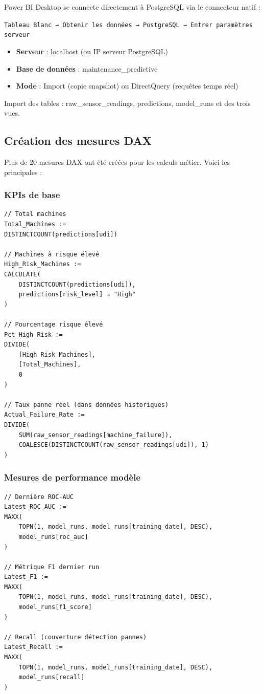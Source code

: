 \documentclass[a4paper,12pt,twoside]{report}
\begin{document}
Power BI Desktop se connecte directement à PostgreSQL via le connecteur natif :

\texttt{Tableau Blanc → Obtenir les données → PostgreSQL → Entrer paramètres serveur}

\begin{itemize}
    \item \textbf{Serveur} : localhost (ou IP serveur PostgreSQL)
    \item \textbf{Base de données} : maintenance\_predictive
    \item \textbf{Mode} : Import (copie snapshot) ou DirectQuery (requêtes temps réel)
\end{itemize}

Import des tables : raw\_sensor\_readings, predictions, model\_runs et des trois vues.

\subsection{Création des mesures DAX}

Plus de 20 mesures DAX ont été créées pour les calculs métier. Voici les principales :

\subsubsection{KPIs de base}

\begin{lstlisting}[language=DAX]
// Total machines
Total_Machines := 
DISTINCTCOUNT(predictions[udi])

// Machines à risque élevé
High_Risk_Machines := 
CALCULATE(
    DISTINCTCOUNT(predictions[udi]),
    predictions[risk_level] = "High"
)

// Pourcentage risque élevé
Pct_High_Risk := 
DIVIDE(
    [High_Risk_Machines],
    [Total_Machines],
    0
)

// Taux panne réel (dans données historiques)
Actual_Failure_Rate := 
DIVIDE(
    SUM(raw_sensor_readings[machine_failure]),
    COALESCE(DISTINCTCOUNT(raw_sensor_readings[udi]), 1)
)
\end{lstlisting}

\subsubsection{Mesures de performance modèle}

\begin{lstlisting}[language=DAX]
// Dernière ROC-AUC
Latest_ROC_AUC := 
MAXX(
    TOPN(1, model_runs, model_runs[training_date], DESC),
    model_runs[roc_auc]
)

// Métrique F1 dernier run
Latest_F1 := 
MAXX(
    TOPN(1, model_runs, model_runs[training_date], DESC),
    model_runs[f1_score]
)

// Recall (couverture détection pannes)
Latest_Recall := 
MAXX(
    TOPN(1, model_runs, model_runs[training_date], DESC),
    model_runs[recall]
)
\end{lstlisting}
\end{document}
